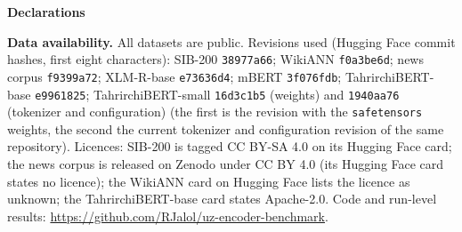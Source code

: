 \documentclass[11pt]{book}
\begin{document}
\begin{center}
\textbf{Declarations}
\end{center}

\textbf{Data availability.} All datasets are public. Revisions used (Hugging Face commit hashes, first eight characters): SIB-200 \texttt{38977a66}; WikiANN \texttt{f0a3be6d}; news corpus \texttt{f9399a72}; XLM-R-base \texttt{e73636d4}; mBERT \texttt{3f076fdb}; TahrirchiBERT-base \texttt{e9961825}; TahrirchiBERT-small \texttt{16d3c1b5} (weights) and \texttt{1940aa76} (tokenizer and configuration) (the first is the revision with the \texttt{safetensors} weights, the second the current tokenizer and configuration revision of the same repository). Licences: SIB-200 is tagged CC BY-SA 4.0 on its Hugging Face card; the news corpus is released on Zenodo under CC BY 4.0 (its Hugging Face card states no licence); the WikiANN card on Hugging Face lists the licence as unknown; the TahrirchiBERT-base card states Apache-2.0. Code and run-level results: \url{https://github.com/RJalol/uz-encoder-benchmark}.
\end{document}
